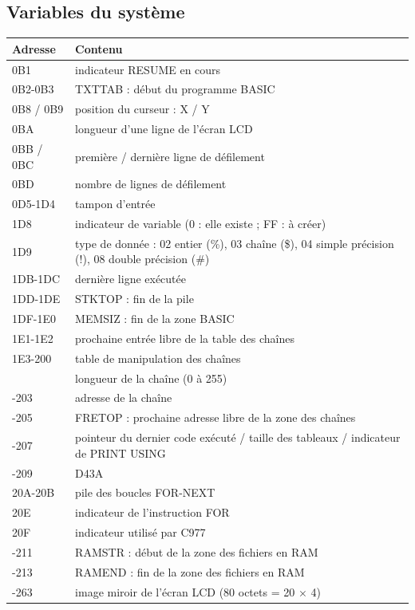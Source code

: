 \documentclass[a4paper,10pt]{article}
\begin{document}
\subsection{Variables du système}
{\small
\begin{longtable}{@{}>{\ttfamily}l>{\raggedright\arraybackslash}p{12.5cm}@{}}
\toprule
\normalfont Adresse & Contenu \\
\midrule\endhead
\bottomrule\endfoot
0B1 & indicateur RESUME en cours \\
0B2-0B3 & TXTTAB : début du programme BASIC \\
0B8 / 0B9 & position du curseur : X / Y \\
0BA & longueur d'une ligne de l'écran LCD \\
0BB / 0BC & première / dernière ligne de défilement \\
0BD & nombre de lignes de défilement \\
0D5-1D4 & tampon d'entrée \\
1D8 & indicateur de variable (0 : elle existe ; FF : à créer) \\
1D9 & type de donnée : 02 entier (\%), 03 chaîne (\$), 04 simple précision (!), 08 double précision (\#) \\
1DB-1DC & dernière ligne exécutée \\
1DD-1DE & STKTOP : fin de la pile \\
1DF-1E0 & MEMSIZ : fin de la zone BASIC \\
1E1-1E2 & prochaine entrée libre de la table des chaînes \\
1E3-200 & table de manipulation des chaînes \\
201 & longueur de la chaîne (0 à 255) \\
202-203 & adresse de la chaîne \\
204-205 & FRETOP : prochaine adresse libre de la zone des chaînes \\
206-207 & pointeur du dernier code exécuté / taille des tableaux / indicateur de PRINT USING \\
208-209 & D43A \\
20A-20B & pile des boucles FOR-NEXT \\
20E & indicateur de l'instruction FOR \\
20F & indicateur utilisé par C977 \\
210-211 & RAMSTR : début de la zone des fichiers en RAM \\
212-213 & RAMEND : fin de la zone des fichiers en RAM \\
214-263 & image miroir de l'écran LCD (80 octets = 20 $\times$ 4) \\

\end{longtable}}
\end{document}
